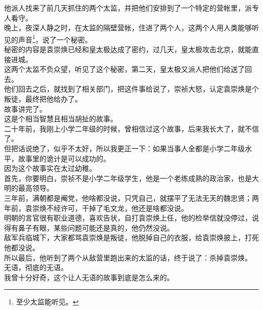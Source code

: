 \begin{multicols}{\theparacolNo}
他派人找来了前几天抓住的两个太监，并把他们安排到了一个特定的营帐里，派专人看守。\\

晚上，夜深人静之时，在太监的隔壁营帐，住进了两个人，这两个人用人类能够听见的声音\footnote{至少太监能听见。}，说了一个秘密。\\

秘密的内容是袁崇焕已经和皇太极达成了密约，过几天，皇太极攻击北京，就能直接进城。\\

这两个太监不负众望，听见了这个秘密，第二天，皇太极又派人把他们给送了回去。\\

他们回去之后，就找到了相关部门，把这件事给说了，崇祯大怒，认定袁崇焕是个叛徒，最终把他给办了。\\

故事讲完了。\\

这是个相当智慧且相当胡扯的故事。\\

二十年前，我刚上小学二年级的时候，曾相信过这个故事，后来我长大了，就不信了。\\

但把话说绝了，似乎不太好，所以我更正一下：如果当事人全都是小学二年级水平，故事里的诡计是可以成功的。\\

因为这个故事实在太过幼稚。\\

首先，你要明白，崇祯不是小学二年级学生，他是一个老练成熟的政治家，也是大明的最高领导。\\

三年前，满朝都是阉党，他啥都没说，只凭自己，就摆平了无法无天的魏忠贤；两年前，袁崇焕不经许可，干掉了毛文龙，他还是啥都没说。\\

明朝的言官很有职业道德，喜欢告状，自打袁崇焕上任，他的检举信就没停过，说得有鼻子有眼，某些问题可能还是真的，他仍然没说。\\

敌军兵临城下，大家都骂袁崇焕是叛徒，他脱掉自己的衣服，给袁崇焕披上，打死他都没说。\\

所以最后，他听到了两个从敌营里跑出来的太监的话，终于说了：杀掉袁崇焕。\\

无语，彻底的无语。\\

我曾十分好奇，这个让人无语的故事到底是怎么来的。\\


\end{multicols}
